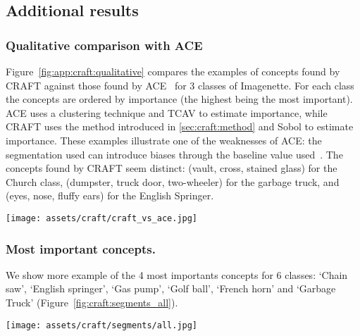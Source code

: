\subsection{Additional results}
\label{apx:craft:more-craft}

\subsubsection{Qualitative comparison with ACE}\label{apx:qualitative}

Figure~\ref{fig:app:craft:qualitative} compares the examples of concepts found by CRAFT against those found by ACE~\cite{ghorbani2019towards} for 3 classes of Imagenette. 
For each class the concepts are ordered by importance (the highest being the most important). 
ACE uses a clustering technique and TCAV to estimate importance, while CRAFT uses the method introduced in \ref{sec:craft:method} and Sobol to estimate importance. These examples illustrate one of the weaknesses of ACE: the segmentation used can introduce biases through the baseline value used~\cite{sturmfels2020visualizing,fong2017meaningful}. The concepts found by CRAFT seem distinct: (vault, cross, stained glass) for the Church class, (dumpster, truck door, two-wheeler) for the garbage truck, and (eyes, nose, fluffy ears) for the English Springer.

\begin{figure*}[ht]
  \texttt{[image: assets/craft/craft\_vs\_ace.jpg]}
  \caption{ \textbf{Qualitative comparison.} We compare concepts found by our method (top) to those extracted with ACE~\cite{ghorbani2019towards} (bottom) for the classes \textit{Church}, \textit{Garbage truck} and \textit{English springer} from ILSVRC2012~\cite{imagenet_cvpr09}. %
  }
  \label{fig:app:craft:qualitative}
\end{figure*}

\subsubsection{Most important concepts.} We show more example of the 4 most importants concepts for 6 classes: `Chain saw', `English springer', `Gas pump', `Golf ball', `French horn' and `Garbage Truck' (Figure~\ref{fig:craft:segments_all}).%

\begin{figure*}[ht]
    \centering
      \texttt{[image: assets/craft/segments/all.jpg]}
      \caption{ \textbf{CRAFT most important concepts}. The 4 most important concepts ranked by importance (left to right) for the following classes: `English springer', `Chain saw',  `Gas pump', `Golf ball', `French horn',  and `Garbage truck'.
      }
      \label{fig:craft:segments_all}
\end{figure*}
    




